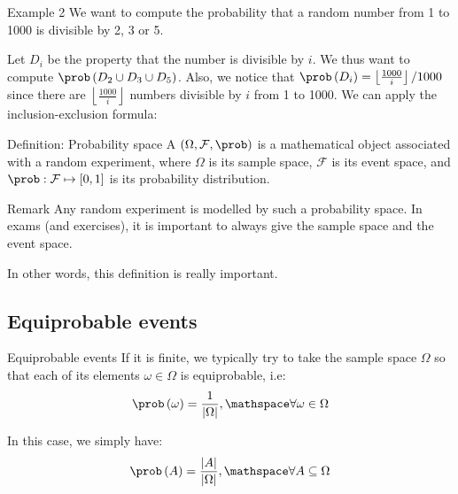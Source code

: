 \documentclass[a4paper]{article}
\begin{document}
\begin{parag}{Example 2}
    We want to compute the probability that a random number from 1 to 1000 is divisible by 2, 3 or 5.

    Let $D_i$ be the property that the number is divisible by $i$. We thus want to compute $\prob\left(D_2 \cup D_3 \cup D_5\right)$. Also, we notice that $\prob\left(D_i\right) = \left\lfloor \frac{1000}{i} \right\rfloor  / 1000$ since there are $\left\lfloor \frac{1000}{i} \right\rfloor$ numbers divisible by $i$ from 1 to 1000. We can apply the inclusion-exclusion formula: 
\end{parag}


\begin{parag}{Definition: Probability space}
    A  $\left(\Omega, \mathcal{F}, \prob\right)$ is a mathematical object associated with a random experiment, where $\Omega$ is its sample space, $\mathcal{F}$ is its event space, and $\prob : \mathcal{F} \mapsto \left[0, 1\right]$ is its probability distribution.

    \begin{subparag}{Remark}
        Any random experiment is modelled by such a probability space. In exams (and exercises), it is important to always give the sample space and the event space.

        In other words, this definition is really important.
    \end{subparag}
\end{parag}

\subsection{Equiprobable events}
\begin{parag}{Equiprobable events}
    If it is finite, we typically try to take the sample space $\Omega$ so that each of its elements $\omega \in \Omega$ is equiprobable, i.e: 
    \[\prob\left(\omega\right) = \frac{1}{\left|\Omega\right|}, \mathspace \forall \omega \in \Omega\]

    In this case, we simply have: 
    \[\prob\left(A\right) = \frac{\left|A\right|}{\left|\Omega\right|}, \mathspace \forall A \subseteq \Omega\]
\end{parag}
\end{document}
